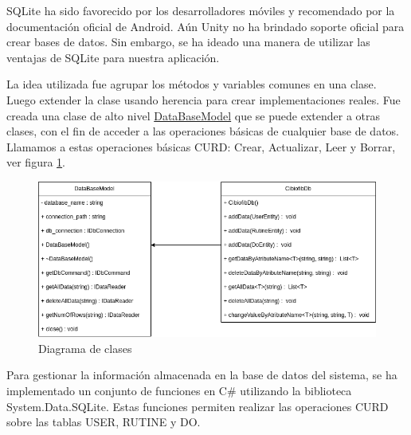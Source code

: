 SQLite ha sido favorecido por los desarrolladores móviles y recomendado por la documentación oficial de Android. Aún Unity no ha brindado soporte oficial para crear bases de datos. Sin embargo, se ha ideado una manera de utilizar las ventajas de SQLite para nuestra aplicación.

La idea utilizada fue agrupar los métodos y variables comunes en una clase. Luego extender la clase usando herencia para crear implementaciones reales. Fue creada una clase de alto nivel \underline{DataBaseModel}  que se puede extender a otras clases, con el fin de acceder a las operaciones básicas de cualquier base de datos. Llamamos a estas operaciones básicas CURD: Crear, Actualizar, Leer y Borrar, ver figura \ref{fig: diagram-db}.

\begin{figure}[ht]
    \centering
    \includegraphics[scale=0.6]{images/diagram-db.png}
    \caption{Diagrama de clases}
    \label{fig: diagram-db}
\end{figure}

Para gestionar la información almacenada en la base de datos del sistema, se ha implementado un conjunto de funciones en C\# utilizando la biblioteca System.Data.SQLite. Estas funciones permiten realizar las operaciones CURD sobre las tablas USER, RUTINE y DO.

